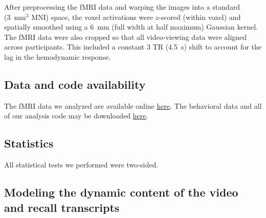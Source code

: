 \documentclass{article}
\begin{document}
After preprocessing the fMRI data and warping the images into a standard (3~mm$^3$ MNI) space, the voxel activations were $z$-scored (within voxel) and spatially smoothed using a 6~mm (full width at half maximum) Gaussian kernel.  The fMRI data were also cropped so that all video-viewing data were aligned across participants.  This included a constant 3 TR (4.5~s) shift to account for the lag in the hemodynamic response.  \citep[All of these preprocessing steps followed][where additional details may be found.]{ChenEtal17}

\subsection*{Data and code availability}
The fMRI data we analyzed are available online \href{http://dataspace.princeton.edu/jspui/handle/88435/dsp01nz8062179}{\underline{here}}.  The behavioral data and all of our analysis code may be downloaded \href{https://github.com/ContextLab/sherlock-topic-model-paper}{\underline{here}}.

\subsection*{Statistics}
All statistical tests we performed were two-sided.

\subsection*{Modeling the dynamic content of the video and recall transcripts}
\end{document}
